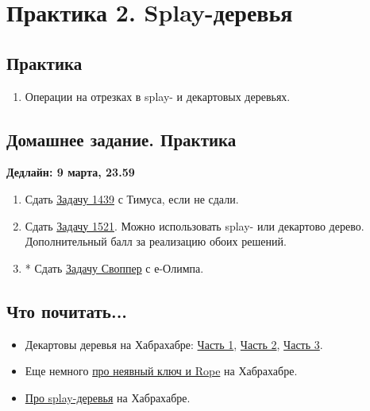 \section{Практика 2. Splay-деревья}

\subsection{Практика}

\begin{enumerate}

  \item Операции на отрезках в splay- и декартовых деревьях.

\end{enumerate}

\subsection{Домашнее задание. Практика}
\textbf{Дедлайн: 9 марта, 23.59}

\begin{enumerate}

  \item Сдать \href{http://acm.timus.ru/problem.aspx?space=1&num=1439}
{Задачу 1439} с Тимуса, если не сдали.

  \item Сдать \href{http://acm.timus.ru/problem.aspx?space=1&num=1521}
{Задачу 1521}. Можно использовать splay- или декартово дерево. Дополнительный 
  балл за реализацию обоих решений.

  \item* Сдать \href{http://www.e-olimp.com/problems/689}{Задачу Своппер} с 
е-Олимпа.

\end{enumerate}

\subsection{Что почитать...}

\begin{itemize}
  
  \item Декартовы деревья на Хабрахабре: 
\href{http://habrahabr.ru/post/101818/}{Часть 1}, 
\href{http://habrahabr.ru/post/102006/}{Часть 2},
\href{http://habrahabr.ru/post/102364/}{Часть 3}.

  \item Еще немного \href{http://habrahabr.ru/post/112394/}{про неявный ключ и 
  Rope} на Хабрахабре.
  
  \item \href{http://habrahabr.ru/post/210296/}{Про splay-деревья} на 
  Хабрахабре.

\end{itemize}


\clearpage
